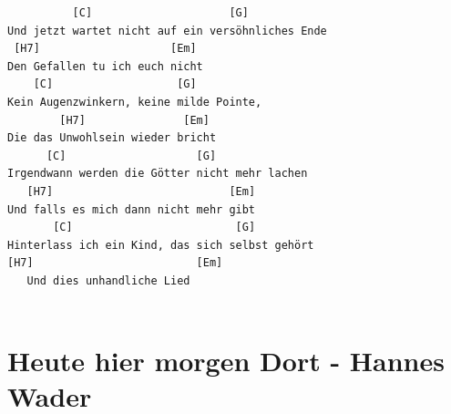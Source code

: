 \documentclass[]{book}
\let\stdsection\section
\renewcommand\section{\clearpage\stdsection}
\begin{document}
\begin{verbatim}
          [C]                     [G]
Und jetzt wartet nicht auf ein versöhnliches Ende 
 [H7]                    [Em]
Den Gefallen tu ich euch nicht 
    [C]                   [G]
Kein Augenzwinkern, keine milde Pointe,
        [H7]               [Em]
Die das Unwohlsein wieder bricht
      [C]                    [G]
Irgendwann werden die Götter nicht mehr lachen 
   [H7]                           [Em]
Und falls es mich dann nicht mehr gibt 
       [C]                         [G]
Hinterlass ich ein Kind, das sich selbst gehört
[H7]                         [Em]
   Und dies unhandliche Lied
   

\end{verbatim}

\hypertarget{heute-hier-morgen-dort---hannes-wader}{%
\section{Heute hier morgen Dort - Hannes Wader}\label{heute-hier-morgen-dort---hannes-wader}}
\end{document}

